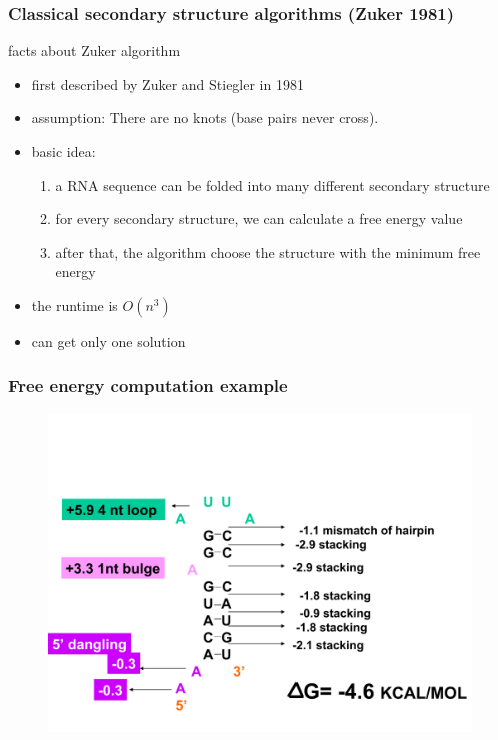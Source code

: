 \documentclass[ignorenonframetext,10pt]{beamer}
\begin{document}
\begin{frame}
\frametitle{\large Classical secondary structure algorithms (Zuker 1981)}
  \begin{block}{facts about Zuker algorithm}
    \begin{itemize}
    \item first described by Zuker and Stiegler in 1981
    \item assumption: There are no knots (base pairs never cross).
    \item basic idea: 
    \begin{enumerate}
      \item a RNA sequence can be folded into many different secondary structure
      \item for every secondary structure, we can calculate a free energy value
      \item after that, the algorithm choose the structure with the minimum free energy
    \end{enumerate}
    \item the runtime is $O(n^3)$
    \item can get only one solution
    \end{itemize}
  \end{block}
\end{frame}


\begin{frame}
\frametitle{Free energy computation example}  
\begin{figure}
  \includegraphics[scale=0.4]{images/mfe_example.pdf} 
\end{figure}
\end{frame}
\end{document}
